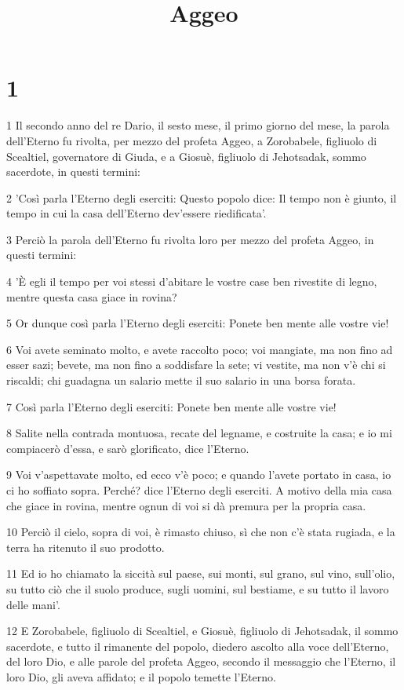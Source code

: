 

\title{Aggeo}


\chapter{1}

\par 1 Il secondo anno del re Dario, il sesto mese, il primo giorno del mese, la parola dell'Eterno fu rivolta, per mezzo del profeta Aggeo, a Zorobabele, figliuolo di Scealtiel, governatore di Giuda, e a Giosuè, figliuolo di Jehotsadak, sommo sacerdote, in questi termini:
\par 2 'Così parla l'Eterno degli eserciti: Questo popolo dice: Il tempo non è giunto, il tempo in cui la casa dell'Eterno dev'essere riedificata'.
\par 3 Perciò la parola dell'Eterno fu rivolta loro per mezzo del profeta Aggeo, in questi termini:
\par 4 'È egli il tempo per voi stessi d'abitare le vostre case ben rivestite di legno, mentre questa casa giace in rovina?
\par 5 Or dunque così parla l'Eterno degli eserciti: Ponete ben mente alle vostre vie!
\par 6 Voi avete seminato molto, e avete raccolto poco; voi mangiate, ma non fino ad esser sazi; bevete, ma non fino a soddisfare la sete; vi vestite, ma non v'è chi si riscaldi; chi guadagna un salario mette il suo salario in una borsa forata.
\par 7 Così parla l'Eterno degli eserciti: Ponete ben mente alle vostre vie!
\par 8 Salite nella contrada montuosa, recate del legname, e costruite la casa; e io mi compiacerò d'essa, e sarò glorificato, dice l'Eterno.
\par 9 Voi v'aspettavate molto, ed ecco v'è poco; e quando l'avete portato in casa, io ci ho soffiato sopra. Perché? dice l'Eterno degli eserciti. A motivo della mia casa che giace in rovina, mentre ognun di voi si dà premura per la propria casa.
\par 10 Perciò il cielo, sopra di voi, è rimasto chiuso, sì che non c'è stata rugiada, e la terra ha ritenuto il suo prodotto.
\par 11 Ed io ho chiamato la siccità sul paese, sui monti, sul grano, sul vino, sull'olio, su tutto ciò che il suolo produce, sugli uomini, sul bestiame, e su tutto il lavoro delle mani'.
\par 12 E Zorobabele, figliuolo di Scealtiel, e Giosuè, figliuolo di Jehotsadak, il sommo sacerdote, e tutto il rimanente del popolo, diedero ascolto alla voce dell'Eterno, del loro Dio, e alle parole del profeta Aggeo, secondo il messaggio che l'Eterno, il loro Dio, gli aveva affidato; e il popolo temette l'Eterno.
